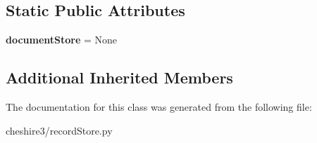 \subsection*{Static Public Attributes}
\begin{DoxyCompactItemize}
\item 
\hypertarget{classcheshire3_1_1record_store_1_1_redirect_record_store_a80d29ba34c8263c0e0c6f594f754971a}{{\bfseries document\-Store} = None}\label{classcheshire3_1_1record_store_1_1_redirect_record_store_a80d29ba34c8263c0e0c6f594f754971a}

\end{DoxyCompactItemize}
\subsection*{Additional Inherited Members}


The documentation for this class was generated from the following file\-:\begin{DoxyCompactItemize}
\item 
cheshire3/record\-Store.\-py\end{DoxyCompactItemize}
